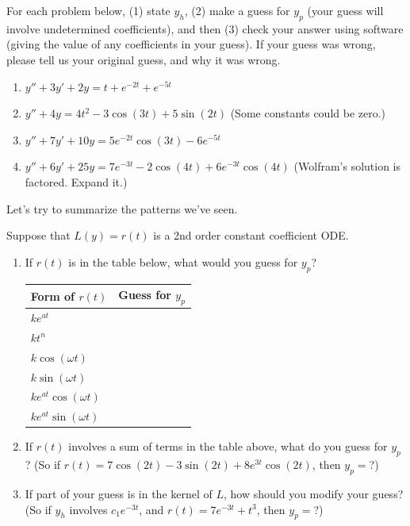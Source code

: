 \begin{problem}
 For each problem below, (1) state $y_h$, (2) make a guess for $y_p$ (your guess will involve undetermined coefficients), and then (3) check your answer using software (giving the value of any coefficients in your guess). If your guess was wrong, please tell us your original guess, and why it was wrong. 
\begin{enumerate}
 \item $y''+3y'+2y=t+e^{-2t}+e^{-5t}$
 \item $y''+4y = 4t^2-3\cos(3t)+5\sin(2t)$ (Some constants could be zero.)
 \item $y''+7y'+10y= 5e^{-2t}\cos(3t) -6e^{-5t}$
 \item $y''+6y'+25y = 7e^{-3t}-2\cos(4t) +6e^{-3t}\cos(4t)$ (Wolfram's solution is factored.  Expand it.)
\end{enumerate}
\end{problem}

Let's try to summarize the patterns we've seen. 
\begin{problem}
 Suppose that $L(y)=r(t)$ is a 2nd order constant coefficient ODE. 
\begin{enumerate}
 \item If $r(t)$ is in the table below, what would you guess for $y_p$?
\begin{center}
\begin{tabular}{|l|l|}
\hline
Form of $r(t)$ & Guess for $y_p$\quad\quad\quad\quad\quad\quad\quad\quad\quad\quad\quad\quad\quad\quad\quad\\\hline\hline
$ke^{at}$ & \\\hline
$kt^n$ & \\\hline
$k\cos(\omega t)$ & \\\hline
$k\sin(\omega t)$ & \\\hline
$ke^{at}\cos(\omega t)$& \\\hline
$ke^{at}\sin(\omega t)$ & \\\hline
\end{tabular}
\end{center}
\item If $r(t)$ involves a sum of terms in the table above, what do you guess for $y_p$? 
(So if $r(t) = 7\cos(2t)-3\sin(2t)+8e^{3t}\cos(2t)$, then $y_p=$?)
\item If part of your guess is in the kernel of $L$, how should you modify your guess?  
(So if $y_h$ involves $c_1e^{-3t}$, and $r(t)=7e^{-3t}+t^3$, then $y_p=$?)
\end{enumerate}
\end{problem}

